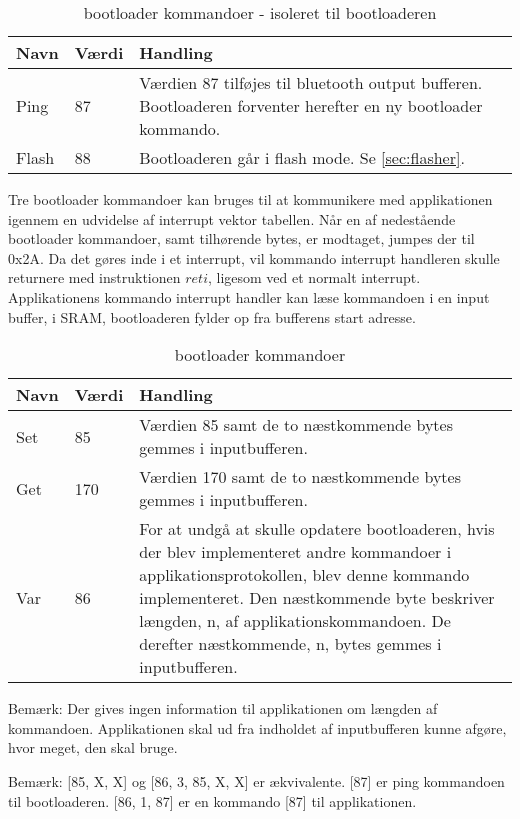 \begin{table}[H]
	\caption{bootloader kommandoer - isoleret til bootloaderen}
	\label{tab:blappcommands}
	\centering

	\begin{tabular}{|l|l|p{13cm}|}
		\hline
		\textbf{Navn} & \textbf{Værdi} & \textbf{Handling} \\
		\hline
		Ping & 87 & Værdien 87 tilføjes til bluetooth output bufferen. Bootloaderen forventer herefter en ny bootloader kommando.\\
		\hline
		Flash & 88 & Bootloaderen går i flash mode. Se \ref{sec:flasher}. \\
		\hline
	\end{tabular}
\end{table}

Tre bootloader kommandoer kan bruges til at kommunikere med applikationen igennem en udvidelse af interrupt vektor tabellen.
Når en af nedestående bootloader kommandoer, samt tilhørende bytes, er modtaget, jumpes der til 0x2A. Da det gøres inde i et interrupt, vil kommando interrupt handleren skulle returnere med instruktionen $reti$, ligesom ved et normalt interrupt. Applikationens kommando interrupt handler kan læse kommandoen i en input buffer, i SRAM, bootloaderen fylder op fra bufferens start adresse.

\begin{table}[H]
	\caption{bootloader kommandoer}
	\label{tab:blblcommands}
	\centering

	\begin{tabular}{|l|l|p{13cm}|}
		\hline
		\textbf{Navn} & \textbf{Værdi} & \textbf{Handling} \\
		\hline
		Set & 85 & Værdien 85 samt de to næstkommende bytes gemmes i inputbufferen.\\
		\hline
		Get & 170 & Værdien 170 samt de to næstkommende bytes gemmes i inputbufferen.\\
		\hline
		Var & 86 & For at undgå at skulle opdatere bootloaderen, hvis der blev implementeret andre kommandoer i applikationsprotokollen, blev denne kommando implementeret. Den næstkommende byte beskriver længden, n, af applikationskommandoen. De derefter næstkommende, n, bytes gemmes i inputbufferen.\\
		\hline
	\end{tabular}
\end{table}

\begin{mdquote}
	Bemærk: Der gives ingen information til applikationen om længden af kommandoen. Applikationen skal ud fra indholdet af inputbufferen kunne afgøre, hvor meget, den skal bruge.
\end{mdquote}
\begin{mdquote}
Bemærk: [85, X, X] og [86, 3, 85, X, X] er ækvivalente. [87] er ping kommandoen til bootloaderen. [86, 1, 87] er en kommando [87] til applikationen.
\end{mdquote}

